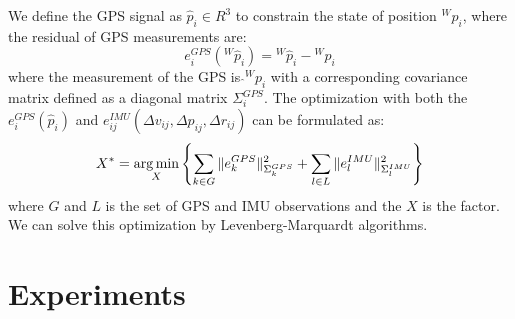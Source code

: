 We define the GPS signal as $\hat p_i \in R^3$ to constrain the state of position ${}^Wp_i$, where the residual of GPS measurements are:
\begin{equation}
e^{GPS}_i( {}^W \hat p_i) = {}^W \hat p_i -  {}^Wp_i 
\end{equation}
where the measurement of the GPS is $\hat {}^Wp_i$ with a corresponding covariance matrix defined as a diagonal matrix $\Sigma^{GPS}_i$.
The optimization with both the $e^{GPS}_i(\hat p_i)$ and $e^{IMU}_{ij}(\Delta v_{ij}, \Delta p_{ij}, \Delta r_{ij})$ can be formulated as:
\begin{equation}
X^* = \operatorname*{arg\,min}_{X}\left\{ \sum_{k\in G} \|e^{GPS}_k\|^2_{\Sigma^{GPS}_k} +  \sum_{l \in L} \| e^{IMU}_l \|^2_{\Sigma^{IMU}_l} \right\}
\end{equation}
where $G$ and $L$ is the set of GPS and IMU observations and the $X$ is the factor. We can solve this optimization by Levenberg-Marquardt algorithms.

\section{Experiments}
\begin{table}[!t]
    \caption{Dataset summary showing the comprehensive evaluation across different IMU grades and platforms}
    \centering
\end{table}

